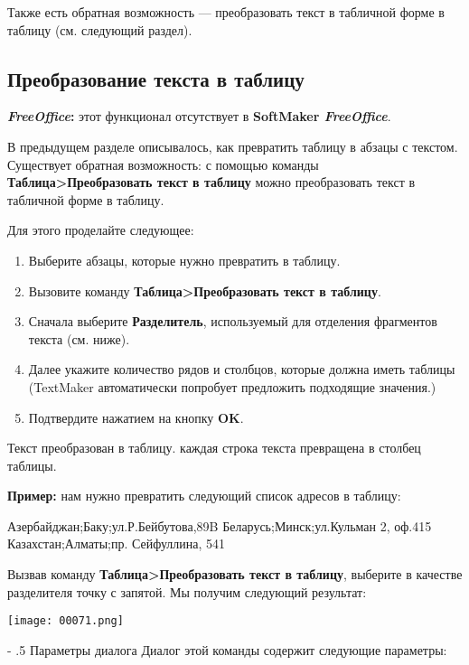 ﻿\documentclass[a4paper,10pt]{article}
\makeatletter
\renewcommand\paragraph{%
   \@startsection{paragraph}{4}{0mm}%
      {-\baselineskip}%
      {.5\baselineskip}%
      {\normalfont\normalsize\bfseries}}
\makeatother
\begin{document}
Также есть обратная возможность — преобразовать текст в табличной форме в таблицу (см. следующий раздел).

\subsection{Преобразование текста в таблицу}
\begin{mdframed}[backgroundcolor=pink!50]
\textbf{\textit{FreeOffice}:} этот функционал отсутствует в \textbf{SoftMaker \textit{FreeOffice}}.
\end{mdframed}

В предыдущем разделе описывалось, как превратить таблицу в абзацы с текстом. Существует обратная возможность: с помощью команды \textbf{Таблица>Преобразовать текст в таблицу} можно преобразовать текст в табличной форме в таблицу.

Для этого проделайте следующее:

\begin{enumerate}
 \item Выберите абзацы, которые нужно превратить в таблицу.
 \item Вызовите команду \textbf{Таблица>Преобразовать текст в таблицу}.
 \item Сначала выберите \textbf{Разделитель}, используемый для отделения фрагментов текста (см. ниже).
 \item Далее укажите количество рядов и столбцов, которые должна иметь таблицы (TextMaker автоматически попробует предложить подходящие значения.)
 \item Подтвердите нажатием на кнопку \textbf{OK}.
\end{enumerate}

Текст преобразован в таблицу. каждая строка текста превращена в столбец таблицы.

\textbf{Пример:} нам нужно превратить следующий список адресов в таблицу:

Азербайджан;Баку;ул.Р.Бейбутова,89B
Беларусь;Минск;ул.Кульман 2, оф.415
Казахстан;Алматы;пр. Сейфуллина, 541

Вызвав команду \textbf{Таблица>Преобразовать текст в таблицу}, выберите в качестве разделителя точку с запятой. Мы получим следующий результат:

\texttt{[image: 00071.png]}

\paragraph{Параметры диалога}
Диалог этой команды содержит следующие параметры:
\end{document}

